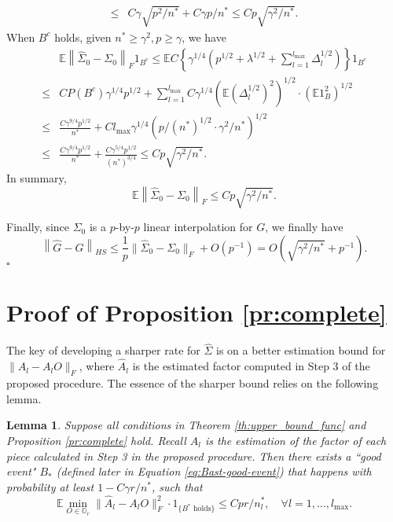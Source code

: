 \documentclass[11pt]{article}
\newtheorem{Lemma}{Lemma}
\newcommand{\0}{{\mathbf{0}}}
\newcommand{\1}{{\mathbf{1}}}
\begin{document}
\begin{enumerate}[leftmargin=*]
\begin{equation*}
\begin{split}
	\leq & C\gamma \sqrt{p^2/n^\ast} + C\gamma p/n^\ast \leq Cp\sqrt{\gamma^2/n^\ast}.
	\end{split}
	\end{equation*}
	When $B^c$ holds, given $n^\ast \geq \gamma^2, p\geq \gamma$, we have
	\begin{equation*}
	\begin{split}
	& \mathbb{E}\left\|\hat{\Sigma}_0 - \Sigma_0\right\|_F1_{B^c} \leq \mathbb{E}C\left\{\gamma^{1/4}(p^{1/2}+\lambda^{1/2}+\sum_{l=1}^{l_{\max}}\Delta_l^{1/2})\right\} 1_{B^c} \\
	\leq & CP(B^c) \gamma^{1/4}p^{1/2} + \sum_{l=1}^{l_{\max}} C\gamma^{1/4} \left(\mathbb{E} (\Delta_l^{1/2})^2\right)^{1/2}\cdot \left(\mathbb{E} 1_{B}^2\right)^{1/2}\\
	\leq & \frac{C\gamma^{9/4}p^{1/2}}{n^\ast} + Cl_{\max}\gamma^{1/4}\left(p/(n^\ast)^{1/2}\cdot \gamma^2/n^\ast\right)^{1/2} \\
	\leq & \frac{C\gamma^{9/4}p^{1/2}}{n^\ast} + \frac{C\gamma^{5/4}p^{1/2}}{(n^\ast)^{3/4}}\leq Cp\sqrt{\gamma^2/n^\ast}.
	\end{split}
	\end{equation*}
	In summary,
	\begin{equation*}
	\mathbb{E}\left\|\hat{\Sigma}_0 - \Sigma_0\right\|_F \leq Cp\sqrt{\gamma^2/n^\ast}.
	\end{equation*}
	
	Finally, since $\Sigma_0$ is a $p$-by-$p$ linear interpolation for $G$, we finally have
	\begin{equation*}
	\left\|\hat{G} - G\right\|_{HS} \leq \frac{1}{p} \|\hat{\Sigma}_0 - \Sigma_0\|_F + O(p^{-1}) = O(\sqrt{\gamma^2/n^\ast} + p^{-1}).
	\end{equation*}
	\quad $\square$
\end{enumerate}

\section{Proof of Proposition \ref{pr:complete}}

The key of developing a sharper rate for $\hat{\Sigma}$ is on a better estimation bound for $\|\hat{A}_l-A_lO\|_F$, where $\hat{A}_l$ is the estimated factor computed in Step 3 of the proposed procedure. The essence of the sharper bound relies on the following lemma.
\begin{Lemma}\label{lm:factor-estimation}
	Suppose all conditions in Theorem \ref{th:upper_bound_func} and Proposition \ref{pr:complete} hold. Recall $\hat{A}_l$ is the estimation of the factor of each piece calculated in Step 3 in the proposed procedure. Then there exists a ``good event" $B_\ast$ (defined later in Equation \ref{eq:Bast-good-event}) that happens with probability at least $1 - C\gamma r/n^\ast$, such that
	$$\mathbb{E}\min_{O\in \mathbb{O}_r}\|\hat{A}_l - A_lO\|_F^2 \cdot 1_{\{B^\ast \text{ holds}\}} \leq Cpr/n_l^\ast, \quad \forall l=1,\dots, l_{\max}.$$	
\end{Lemma}
\end{document}
